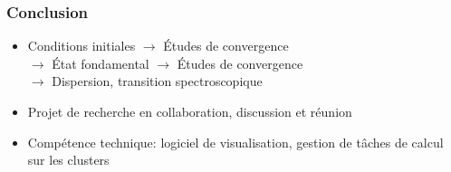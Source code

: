 \documentclass[french]{beamer}
\begin{document}

\begin{frame}
\frametitle{Conclusion}
\begin{itemize}
  \item Conditions initiales $\rightarrow$ Études de convergence\\ $\rightarrow$ État fondamental $\rightarrow$ Études de convergence\\ $\rightarrow$ Dispersion, transition spectroscopique
  \item Projet de recherche en collaboration, discussion et réunion
  \item Compétence technique: logiciel de visualisation, gestion de tâches de calcul sur les clusters
\end{itemize}

\end{frame}
\end{document}
